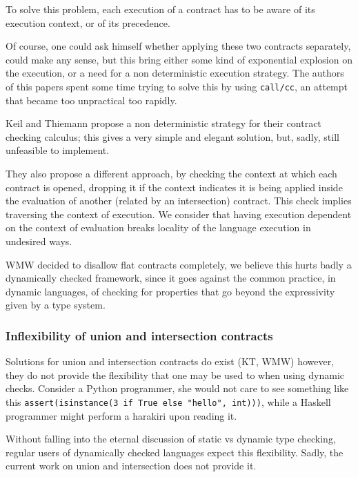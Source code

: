 To solve this problem, each execution of a contract has to be aware of its execution context,
or of its precedence.




Of course, one could ask himself whether applying these two contracts separately,
could make any sense, but this bring either some kind of exponential explosion
on the execution, or a need for a non deterministic execution
strategy.
The authors of this papers spent some time trying to solve this by using
\texttt{call/cc}, an attempt that became too unpractical too rapidly.

Keil and Thiemann propose a non deterministic strategy for their contract checking
calculus; this gives a very simple and elegant solution, but, sadly, still
unfeasible to implement.

They also propose a different approach, by checking the context at which
each contract is opened, dropping
it if the context indicates it is being applied inside the evaluation of another
(related by an intersection) contract.
This check implies traversing the context of execution.
We consider that having execution dependent on the context
of evaluation breaks locality of
the language execution in undesired ways.

WMW decided to disallow flat contracts completely,
we believe this hurts badly a dynamically checked framework, since it goes against
the common practice, in dynamic languages, of checking for properties
that go beyond the expressivity given by a type system.


\subsubsection*{Inflexibility of union and intersection contracts}

Solutions for union and intersection contracts do exist (KT, WMW) however,
they do not provide the flexibility that one may be used to when using dynamic checks.
Consider a Python programmer, she would not care to see something like this
\texttt{assert(isinstance(3 if True else "hello", int)))}, while a Haskell programmer
might perform a harakiri upon reading it.

Without falling into the eternal discussion of static vs dynamic type checking,
regular users of dynamically checked languages expect this flexibility.
Sadly, the current work on union and intersection does not provide it.

